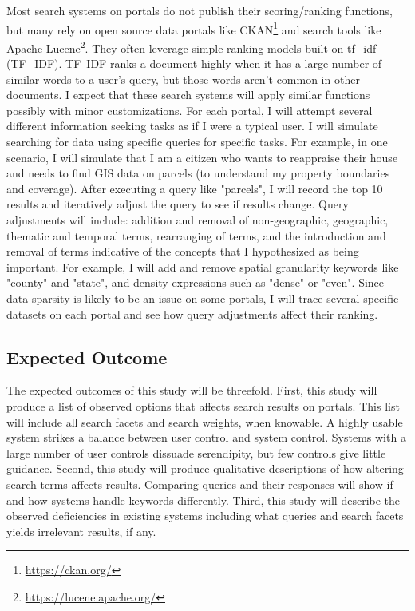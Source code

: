 Most search systems on portals do not publish their scoring/ranking functions, but many rely on open source data portals like CKAN\footnote{\url{https://ckan.org/}} and search tools like Apache Lucene\footnote{\url{https://lucene.apache.org/}}. They often leverage simple ranking models built on \gls{tf_idf} (\acrshort{TF_IDF}). TF–IDF ranks a document highly when it has a large number of similar words to a user's query, but those words aren't common in other documents. I expect that these search systems will apply similar functions possibly with minor customizations. For each portal, I will attempt several different information seeking tasks as if I were a typical user. I will simulate searching for data using specific queries for specific tasks. For example, in one scenario, I will simulate that I am a citizen who wants to reappraise their house and needs to find GIS data on parcels (to understand my property boundaries and coverage). After executing a query like "parcels", I will record the top 10 results and iteratively adjust the query to see if results change. Query adjustments will include: addition and removal of non-geographic, geographic, thematic and temporal terms, rearranging of terms, and the introduction and removal of terms indicative of the concepts that I hypothesized as being important. For example, I will add and remove spatial granularity keywords like "county" and "state", and density expressions such as "dense" or "even". Since data sparsity is likely to be an issue on some portals, I will trace several specific datasets on each portal and see how query adjustments affect their ranking.

\subsection{Expected Outcome}
The expected outcomes of this study will be threefold. First, this study will produce a list of observed options that affects search results on portals. This list will include all search facets and search weights, when knowable. A highly usable system strikes a balance between user control and system control. Systems with a large number of user controls dissuade serendipity, but few controls give little guidance. Second, this study will produce qualitative descriptions of how altering search terms affects results. Comparing queries and their responses will show if and how systems handle keywords differently. Third, this study will describe the observed deficiencies in existing systems including what queries and search facets yields irrelevant results, if any.

